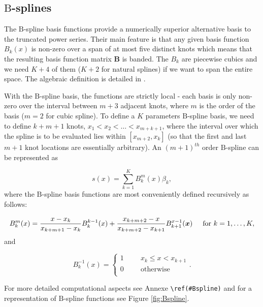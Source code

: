 \documentclass[]{book}
\begin{document}
\hypertarget{mathrmb-splines}{%
\subsection{\texorpdfstring{\(\mathrm{B}\)-splines}{\textbackslash{}mathrm\{B\}-splines}}\label{mathrmb-splines}}

The \(\mathrm{B}\)-spline basis functions provide a numerically superior
alternative basis to the truncated power series. Their main feature is
that any given basis function \(\mathit{B}_k(x)\) is non-zero over a span
of at most five distinct knots which means that the resulting basis
function matrix \(\mathbf{B}\) is banded. The \(\mathit{B}_k\) are piecewise cubics
and we need \(K + 4\) of them (\(K + 2\) for natural splines) if we want to
span the entire space. The algebraic definition is detailed in
\citep{de_boor_practical_1975}.

With the \(\mathrm{B}\)-spline basis, the functions are strictly local -
each basis is only non-zero over the interval between \(m+3\) adjacent
knots, where \(m\) is the order of the basis (\(m = 2\) for cubic spline).
To define a \(K\) parameters \(\mathrm{B}\)-spline basis, we need to define
\(k+m+1\) knots, \(x_1 < x_2 < \dots < x_{m+k+1}\), where the interval over
which the spline is to be evaluated lies within \([x_{m+2},x_k]\) (so that
the first and last \(m+1\) knot locations are essentially arbitrary). An
\((m+1)^{th}\) order \(\mathrm{B}\)-spline can be represented as

\[s(x) = \sum_{k=1}^K B_k^m(x)\beta_k,\] where the \(\mathrm{B}\)-spline
basis functions are most conveniently defined recursively as follows:

\[B_k^m (x) = \frac{x-x_k}{x_{k+m+1} - x_k}B_k^{k-1}(x) + \frac{x_{k+m+2} - x}{x_{k+m+2}-x_{k+1}}B_{k+1}^{x-1}(\boldsymbol{x}) \hspace{.5cm} \text{for } k=1,\dots,K,\]
and

\[B_k^{-1}(x) =  \left\{
    \begin{array}{ll}
        1 \hspace{1cm} x_k \leq x < x_{k+1}  \\
        0 \hspace{1cm} \text{otherwise} \\
    \end{array}
\right. .\]

For more detailed computational aspects see Annexe \texttt{\textbackslash{}ref(\#Bspline)} and
for a representation of \(\mathrm{B}\)-spline functions see Figure
\ref{fig:Bspline}.
\end{document}
